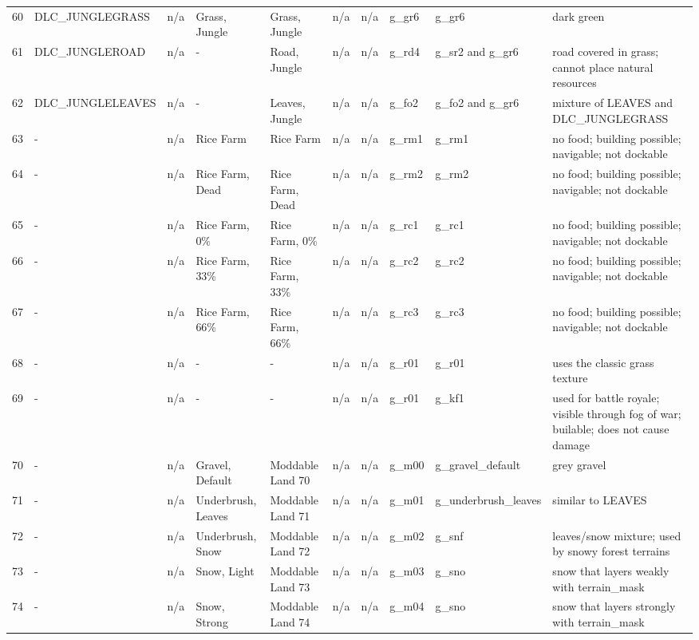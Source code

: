 \begin{appendices}
\begin{landscape}
\begin{longtable}{@{}p{5mm}|p{25mm}p{23mm}|p{14mm}p{14mm}p{14mm}p{14mm}|p{10mm}p{15mm}|p{45mm}@{}}
            60	& DLC\_JUNGLEGRASS	& n/a	& Grass, Jungle	& Grass, Jungle	& n/a	& n/a	& g\_gr6	& g\_gr6		& dark green \\
            61	& DLC\_JUNGLEROAD	& n/a	& -	& Road, Jungle	& n/a	& n/a	& g\_rd4	& g\_sr2 and g\_gr6		& road covered in grass; cannot place natural resources \\
            62	& DLC\_JUNGLELEAVES	& n/a	& -	& Leaves, Jungle	& n/a	& n/a	& g\_fo2	& g\_fo2 and g\_gr6		& mixture of LEAVES and DLC\_JUNGLEGRASS \\
            63	& -	& n/a	& Rice Farm	& Rice Farm	& n/a	& n/a	& g\_rm1	& g\_rm1		& no food; building possible; navigable; not dockable \\
            64	& -	& n/a	& Rice Farm, Dead	& Rice Farm, Dead	& n/a	& n/a	& g\_rm2	& g\_rm2		& no food; building possible; navigable; not dockable \\
            65	& -	& n/a	& Rice Farm, 0\%	& Rice Farm, 0\%	& n/a	& n/a	& g\_rc1	& g\_rc1		& no food; building possible; navigable; not dockable \\
            66	& -	& n/a	& Rice Farm, 33\%	& Rice Farm, 33\%	& n/a	& n/a	& g\_rc2	& g\_rc2		& no food; building possible; navigable; not dockable \\
            67	& -	& n/a	& Rice Farm, 66\%	& Rice Farm, 66\%	& n/a	& n/a	& g\_rc3	& g\_rc3		& no food; building possible; navigable; not dockable \\
            68	& -	& n/a	& -	& -	& n/a	& n/a	& g\_r01	& g\_r01		& uses the classic grass texture \\
            69	& -	& n/a	& -	& -	& n/a	& n/a	& g\_r01	& g\_kf1		& used for battle royale; visible through fog of war; builable; does not cause damage \\
            70	& -	& n/a	& Gravel, Default	& Moddable Land 70	& n/a	& n/a	& g\_m00	& g\_gravel\_default		& grey gravel \\
            71	& -	& n/a	& Underbrush, Leaves	& Moddable Land 71	& n/a	& n/a	& g\_m01	& g\_underbrush\_leaves		& similar to LEAVES \\
            72	& -	& n/a	& Underbrush, Snow	& Moddable Land 72	& n/a	& n/a	& g\_m02	& g\_snf		& leaves/snow mixture; used by snowy forest terrains \\
            73	& -	& n/a	& Snow, Light	& Moddable Land 73	& n/a	& n/a	& g\_m03	& g\_sno		& snow that layers weakly with terrain\_mask \\
            74	& -	& n/a	& Snow, Strong	& Moddable Land 74	& n/a	& n/a	& g\_m04	& g\_sno		& snow that layers strongly with terrain\_mask \\

\end{longtable}
\end{landscape}
\end{appendices}
